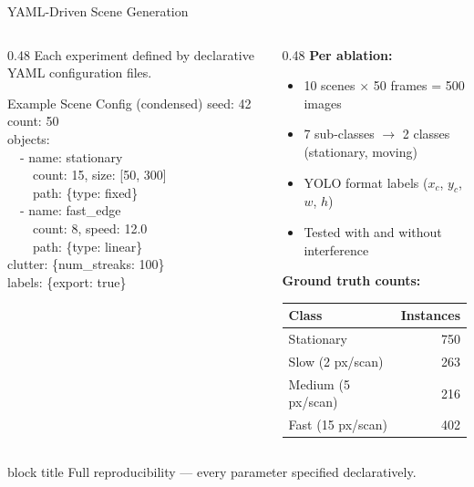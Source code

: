 \documentclass[aspectratio=169, 10pt]{beamer}
\newcommand{\keypoint}[1]{%
  \vfill
  \begin{beamercolorbox}[wd=\textwidth, dp=0.4em, leftskip=0.3cm]{block title}%
    \small #1%
  \end{beamercolorbox}%
}
\begin{document}
\begin{frame}{YAML-Driven Scene Generation}

\begin{columns}[T]
\begin{column}{0.48\textwidth}
  Each experiment defined by declarative YAML configuration files.

  \vspace{0.3cm}

  \begin{block}{Example Scene Config (condensed)}
    \ttfamily\scriptsize
    seed: 42\\
    count: 50\\
    objects:\\
    \ \ - name: stationary\\
    \ \ \ \ count: 15, size: [50, 300]\\
    \ \ \ \ path: \{type: fixed\}\\
    \ \ - name: fast\_edge\\
    \ \ \ \ count: 8, speed: 12.0\\
    \ \ \ \ path: \{type: linear\}\\
    clutter: \{num\_streaks: 100\}\\
    labels: \{export: true\}
  \end{block}
\end{column}
\begin{column}{0.48\textwidth}
  \textbf{Per ablation:}
  \begin{itemize}\setlength{\itemsep}{0pt}
    \item 10 scenes $\times$ 50 frames = 500 images
    \item 7 sub-classes $\rightarrow$ 2 classes (stationary, moving)
    \item YOLO format labels ($x_c$, $y_c$, $w$, $h$)
    \item Tested with and without interference
  \end{itemize}

  \vspace{0.15cm}

  \textbf{Ground truth counts:}

  \vspace{0.1cm}

  {\small\begin{tabular}{@{}l r@{}}
    \toprule
    \textbf{Class} & \textbf{Instances} \\
    \midrule
    Stationary & 750 \\
    Slow (2 px/scan) & 263 \\
    Medium (5 px/scan) & 216 \\
    Fast (15 px/scan) & 402 \\
    \bottomrule
  \end{tabular}}
\end{column}
\end{columns}

\keypoint{Full reproducibility --- every parameter specified declaratively.}
\end{frame}
\end{document}

